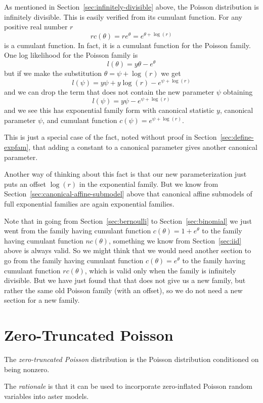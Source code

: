 As mentioned in Section~\ref{sec:infinitely-divisible} above,
the Poisson distribution is infinitely divisible.
This is easily verified from its cumulant function.
For any positive real number $r$
$$
   r c(\theta) = r e^{\theta} = e^{\theta + \log(r)}
$$
is a cumulant function.  In fact, it is a cumulant function for the Poisson
family.  One log likelihood for the Poisson family is
$$
   l(\theta) = y \theta - e^\theta
$$
but if we make the substitution $\theta = \psi + \log(r)$ we get
$$
   l(\psi) = y \psi + y \log(r) - e^{\psi + \log(r)}
$$
and we can drop the term that does not contain the new parameter $\psi$
obtaining
$$
   l(\psi) = y \psi - e^{\psi + \log(r)}
$$
and we see this has exponential family form with canonical statistic $y$,
canonical parameter $\psi$,
and cumulant function $c(\psi) = e^{\psi + \log(r)}$.

This is just a special case of the fact,
noted without proof in Section~\ref{sec:define-expfam},
that adding a constant to a canonical parameter gives
another canonical parameter.

Another way of thinking about this fact is that our new parameterization
just puts an offset $\log(r)$ in the exponential family.
But we know from Section~\ref{sec:canonical-affine-submodel} above
that canonical affine submodels of full exponential families are again
exponential families.

Note that in going from Section~\ref{sec:bernoulli}
to Section~\ref{sec:binomial} we just went from the family having cumulant
function $c(\theta) = 1 + e^\theta$ to the family
having cumulant function $n c(\theta)$,
something we know from Section~\ref{sec:iid} above is always valid.
So we might think that we would need another section to go from the
family having cumulant function $c(\theta) = e^\theta$ to the family
having cumulant function $r c(\theta)$, which is valid only when the
family is infinitely divisible.  But we have just found that that does
not give us a new family, but rather the same old Poisson family
(with an offset), so we do not need a new section for a new family.

\section{Zero-Truncated Poisson}
\label{sec:zero-truncated-poisson}

The \emph{zero-truncated Poisson} distribution is the Poisson distribution
conditioned on being nonzero.

The \emph{rationale} is that it can be used to incorporate zero-inflated
Poisson random variables into aster models.

